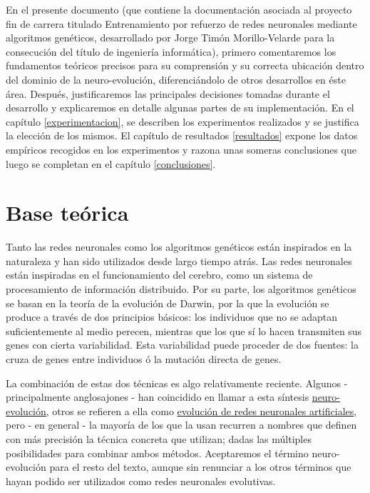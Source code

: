 \documentclass[11pt]{article}
\begin{document}
\begin{titlepage}
 En el presente documento (que contiene la documentaci\'on asociada al proyecto fin de carrera titulado \flqq Entrenamiento por refuerzo de redes neuronales mediante algoritmos gen\'eticos\frqq, desarrollado por Jorge Tim\'on Morillo-Velarde para la consecuci\'on del t\'itulo de ingenier\'ia inform\'atica), primero comentaremos los fundamentos te\'oricos precisos para su comprensi\'on y su correcta ubicaci\'on dentro del dominio de la neuro-evoluci\'on, diferenci\'andolo de otros desarrollos en \'este \'area. Despu\'es, justificaremos las principales decisiones tomadas durante el desarrollo y explicaremos en detalle algunas partes de su implementaci\'on. En el cap\'itulo \ref{experimentacion}, se describen los experimentos realizados y se justifica la elecci\'on de los mismos. El cap\'itulo de resultados \ref{resultados} expone los datos emp\'iricos recogidos en los experimentos y razona unas someras conclusiones que luego se completan en el cap\'itulo \ref{conclusiones}.

\newpage
\section{Base te\'orica}
\label{sec-2}

  \label{baseTeorica}

Tanto las redes neuronales como los algoritmos gen\'eticos est\'an inspirados en la naturaleza y han sido utilizados desde largo tiempo atr\'as. Las redes neuronales est\'an inspiradas en el funcionamiento del cerebro, como un sistema de procesamiento de informaci\'on distribuido. Por su parte, los algoritmos gen\'eticos se basan en la teor\'ia de la evoluci\'on de Darwin, por la que la evoluci\'on se produce a trav\'es de dos principios b\'asicos: los individuos que no se adaptan suficientemente al medio perecen, mientras que los que s\'i lo hacen transmiten sus genes con cierta variabilidad. Esta variabilidad puede proceder de dos fuentes: la cruza de genes entre individuos \'o la mutaci\'on directa de genes.

 La combinaci\'on de estas dos t\'ecnicas es algo relativamente reciente. Algunos - principalmente anglosajones - han coincidido en llamar a esta s\'intesis \href{http://en.wikipedia.org/wiki/Neuroevolution}{neuro-evoluci\'on}, otros se refieren a ella como \href{http://laral.istc.cnr.it/nolfi/papers/HBTNN-A.pdf}{evoluci\'on de redes neuronales artificiales}, pero - en general - la mayor\'ia de los que la usan recurren a nombres que definen con m\'as precisi\'on la t\'ecnica concreta que utilizan; dadas las m\'ultiples posibilidades para combinar ambos m\'etodos. Aceptaremos el t\'ermino neuro-evoluci\'on para el resto del texto, aunque sin renunciar a los otros t\'erminos que hayan podido ser utilizados como redes neuronales evolutivas.


\end{titlepage}
\end{document}
